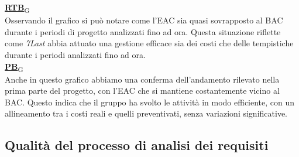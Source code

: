 \begin{flushleft}
\href{https://7last.github.io/docs/pb/documentazione-interna/glossario\#requirements-and-technology-baseline}{\textbf{RTB}\textsubscript{G}} \\
Osservando il grafico si può notare come l'EAC sia quasi sovrapposto al BAC durante i periodi di progetto analizzati fino ad ora. Questa situazione riflette come \textit{7Last} abbia attuato una gestione efficace sia dei costi che delle tempistiche durante i periodi analizzati fino ad ora. \\
\href{https://7last.github.io/docs/pb/documentazione-interna/glossario\#product-baseline}{\textbf{PB}\textsubscript{G}} \\
Anche in questo grafico abbiamo una conferma dell'andamento rilevato nella prima parte del progetto, con l'EAC che si mantiene costantemente vicino al BAC. Questo indica che il gruppo ha svolto le attività in modo efficiente, con un allineamento tra i costi reali e quelli preventivati, senza variazioni significative.
\end{flushleft}

\newpage
\subsection{Qualità del processo di analisi dei requisiti}
